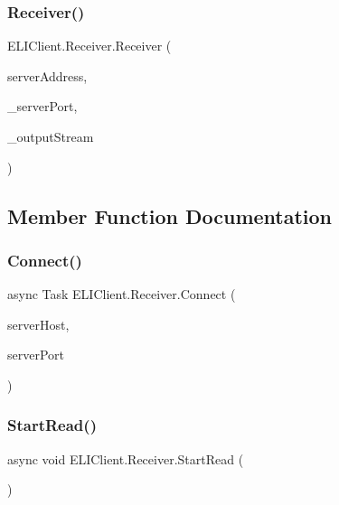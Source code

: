 \subsubsection{\texorpdfstring{Receiver()}{Receiver()}}
{\footnotesize\ttfamily E\+L\+I\+Client.\+Receiver.\+Receiver (\begin{DoxyParamCaption}\item[{string}]{server\+Address,  }\item[{string}]{\+\_\+server\+Port,  }\item[{I\+Random\+Access\+Stream}]{\+\_\+output\+Stream }\end{DoxyParamCaption})\hspace{0.3cm}{\ttfamily [inline]}}



\subsection{Member Function Documentation}
\mbox{\label{class_e_l_i_client_1_1_receiver_aeea41293fbaed9b944bb04c515e5837d}} 
\subsubsection{\texorpdfstring{Connect()}{Connect()}}
{\footnotesize\ttfamily async Task E\+L\+I\+Client.\+Receiver.\+Connect (\begin{DoxyParamCaption}\item[{Host\+Name}]{server\+Host,  }\item[{string}]{server\+Port }\end{DoxyParamCaption})\hspace{0.3cm}{\ttfamily [inline]}}

\mbox{\label{class_e_l_i_client_1_1_receiver_ae4bad110ef531c642ee8ab5a54640925}} 
\subsubsection{\texorpdfstring{Start\+Read()}{StartRead()}}
{\footnotesize\ttfamily async void E\+L\+I\+Client.\+Receiver.\+Start\+Read (\begin{DoxyParamCaption}{ }\end{DoxyParamCaption})\hspace{0.3cm}{\ttfamily [inline]}}



